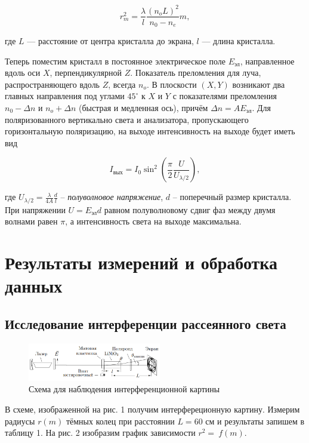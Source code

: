 \documentclass[a4paper]{article}
\begin{document}
\begin{equation}
r_m^2 = \dfrac{\lambda}{l} \dfrac{(n_oL)^2}{n_0 - n_e}m,
\end{equation}

\noindent где $L$ --- расстояние от центра кристалла до экрана, $l$ --- длина кристалла. \medskip


\noindent Теперь поместим кристалл в постоянное электрическое поле $E_{\text{эл}}$, направленное вдоль оси $X$, перпендикулярной $Z$. Показатель преломления для луча, распространяющего вдоль $Z$, всегда $n_o$. В плоскости $(X,Y)$ возникают два главных направления под углами $45^\circ$ к $X$ и $Y$ с показателями преломления $n_0 - \Delta n$ и $n_o + \Delta n$ (быстрая и медленная ось), причём $\Delta n = A E_{\text{эл}}$. Для поляризованного вертикально света и анализатора, пропускающего горизонтальную поляризацию, на выходе интенсивность на выходе будет иметь вид

\begin{equation}
I_{\text{вых}} = I_0 \sin^2 \left(\dfrac{\pi}{2} \dfrac{U}{U_{\lambda/2}} \right),
\end{equation}

\noindent где $U_{\lambda/2} = \frac{\lambda}{4A}\frac{d}{l}$ -- \textit{полуволновое напряжение}, $d$ -- поперечный размер кристалла.  При напряжении $U = E_{\text{эл}}d$ равном полуволновому сдвиг фаз между двумя волнами равен $\pi$, а интенсивность света на выходе максимальна. 

\section{Результаты измерений и обработка данных}
\subsection{Исследование интерференции рассеянного света}

\begin{figure}[ht!]
    \centering
    \includegraphics[width = 0.52\textwidth]{image/pic1.png}
    \caption{Схема для наблюдения интерференционной картины}
\end{figure}

\noindent В схеме, изображенной на рис. 1 получим интерфереционную картину. Измерим радиусы $r(m)$ тёмных колец при расстоянии $L = 60$ см и результаты запишем в таблицу 1. На рис. 2 изобразим график зависимости $r^2 =~f(m)$.
\end{document}
